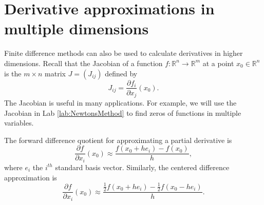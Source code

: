 \section*{Derivative approximations in multiple dimensions}
Finite difference methods can also be used to calculate derivatives in higher dimensions.
Recall that the Jacobian of a function $f:\mathbb{R}^n \rightarrow \mathbb{R}^m$ at a point $x_0 \in \mathbb{R}^n$ is the $m \times n$ matrix $J = (J_{ij})$ defined by
\begin{equation*}
J_{ij} = \frac{\partial f_i}{\partial x_j}(x_0).
\end{equation*}
The Jacobian is useful in many applications.
For example, we will use the Jacobian in Lab \ref{lab:NewtonsMethod} to find zeros of functions in multiple variables.


The forward difference quotient for approximating a partial derivative is
\begin{equation*}
\frac{\partial f}{\partial x_i} (x_0) \approx \frac{f(x_0+h e_i)-f(x_0)}{h},
\end{equation*}
where $e_i$ the $i^{th}$ standard basis vector. 
Similarly, the centered difference approximation is
\begin{equation*}
\frac{\partial f}{\partial x_i} (x_0) \approx \frac{\frac{1}{2}f(x_0+h e_i)-\frac{1}{2}f(x_0-h e_i)}{h}.
\end{equation*}

